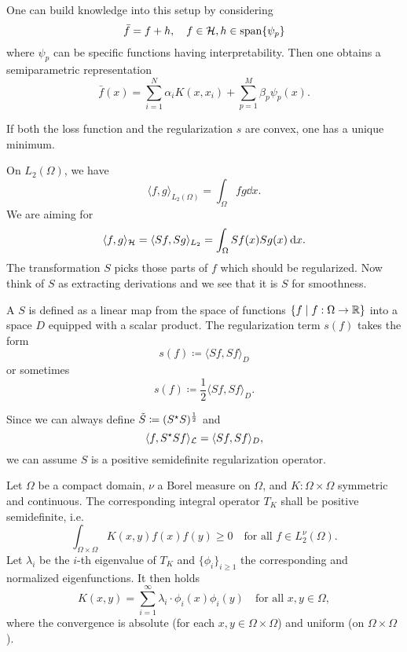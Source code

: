 \documentclass[../lecture-notes.tex]{subfiles}
\begin{document}
\begin{remark}
One can build knowledge into this setup by considering
\[
\bar{f} = f + h, \quad f \in \mathcal{H}, h \in \operatorname*{span}\{ \psi_p \}
\]
where $\psi_p$ can be specific functions having interpretability.
Then one obtains a semiparametric representation
\[
\bar{f}(x) = \sum_{i=1}^N \alpha_i K(x, x_i) + \sum_{p=1}^M \beta_p \psi_p(x).
\]
\end{remark}
\begin{remark}
If both the loss function and the regularization $s$ are convex, one has a unique minimum.
\end{remark}
On $L_2(\Omega)$, we have
\[
	\langle f, g \rangle_{L_2(\Omega)} = \int_\Omega fg \dd x.
\]
We are aiming for
\[
	\langle f, g \rangle_{\mathcal{H}} = \langle Sf, Sg \rangle_{L_2} = \int_\Omega Sf(x) Sg(x) \:\mathrm{d} x.
\]
The transformation $S$ picks those parts of $f$ which should be regularized. Now think of $S$ as extracting derivations and we see that it is $S$ for smoothness.
\begin{definition} %
\label{thm:42}
A  $S$ is defined as a linear map from the space of functions $\{ f \mid f : \Omega \to \mathbb{R} \}$ into a space $D$ equipped with a scalar product.
The regularization term $s(f)$ takes the form
\[
	s(f) \coloneqq \langle Sf, Sf \rangle_D
\]
or sometimes
\[
	s(f) \coloneqq \frac{1}{2} \langle Sf, Sf \rangle_D.
\]
\end{definition}
\begin{remark}
Since we can always define $\tilde{S} \coloneqq (S^{\star} S)^{\frac{1}{2}}$ and
\[
	\langle f, S^{\star} S f \rangle_{\mathcal{L}} = \langle Sf, Sf \rangle_D,
\]
we can assume $S$ is a positive semidefinite regularization operator.
\end{remark}
\begin{theorem} %
\label{thm:43}
Let $\Omega$ be a compact domain, $\nu$ a Borel measure on $\Omega$, and $K : \Omega \times \Omega$ symmetric and continuous.
The corresponding integral operator $T_K$ shall be positive semidefinite, i.e.
\[
	\int_{\Omega \times \Omega} K(x, y) f(x) f(y) \geq 0 \quad \text{for all } f \in L_2^\nu(\Omega).
\]
Let $\lambda_i$ be the $i$-th eigenvalue of $T_K$ and $\{ \phi_i \}_{i \geq 1}$ the corresponding and normalized eigenfunctions.
It then holds
\[
	K(x, y) = \sum_{i=1}^\infty \lambda_i \cdot \phi_i(x) \phi_i(y) \quad \text{for all } x, y \in \Omega,
\]
where the convergence is absolute (for each $x, y \in \Omega \times \Omega$) and uniform (on $\Omega \times \Omega$).
\end{theorem}
\end{document}

